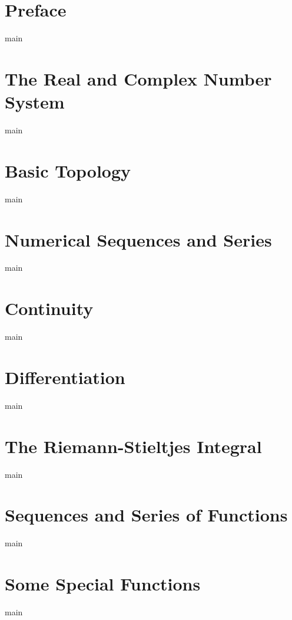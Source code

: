 
\chapter{Preface}\label{chap:00-preface}
{main}

\chapter{The Real and Complex Number System}\label{chap:01-the-real-and-complex-number-system}
{main}

\chapter{Basic Topology}\label{chap:02-basic-topology}
{main}

\chapter{Numerical Sequences and Series}\label{chap:03-numerical-sequences-and-series}
{main}

\chapter{Continuity}\label{chap:04-continuity}
{main}

\chapter{Differentiation}\label{chap:05-differentiation}
{main}

\chapter{The Riemann-Stieltjes Integral}\label{chap:06-the-riemann-stieltjes-integral}
{main}

\chapter{Sequences and Series of Functions}\label{chap:07-sequences-and-series-of-functions}
{main}

\chapter{Some Special Functions}\label{chap:08-some-special-functions}
{main}

